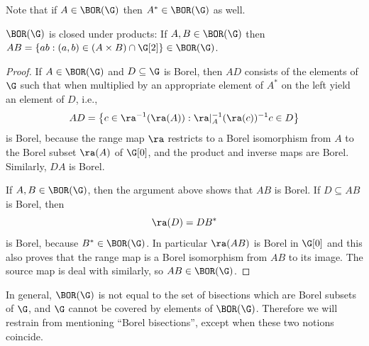 Note that if $A\in\BOR(\G)$ then $A^*\in \BOR(\G)$ as well.

\begin{proposition}
$\BOR(\G)$ is closed under products: If $A,B\in\BOR(\G)$ then $AB=\left\{ab:(a,b)\in(A\times B)\cap\G[2]\right\}\in\BOR(\G)$.
\end{proposition}
\begin{proof}
If $A\in\BOR(\G)$ and $D\subseteq\G$ is Borel, then $AD$ consists of the elements of $\G$ such that when multiplied by an appropriate element of $A^*$ on the left yield an element of $D$, i.e.,
\[AD=\left\{c\in\ra^{-1}(\ra(A)):\ra|_A^{-1}(\ra(c))^{-1}c\in D\right\}\]
is Borel, because the range map $\ra$ restricts to a Borel isomorphism from $A$ to the Borel subset $\ra(A)$ of $\G[0]$, and the product and inverse maps are Borel. Similarly, $DA$ is Borel.

If $A,B\in\BOR(\G)$, then the argument above shows that $AB$ is Borel. If $D\subseteq AB$ is Borel, then
\[\ra(D)=DB^*\]
is Borel, because $B^*\in\BOR(\G)$. In particular $\ra(AB)$ is Borel in $\G[0]$ and this also proves that the range map is a Borel isomorphism from $AB$ to its image. The source map is deal with similarly, so $AB\in\BOR(\G)$.\qedhere
\end{proof}

In general, $\BOR(\G)$ is not equal to the set of bisections which are Borel subsets of $\G$, and $\G$ cannot be covered by elements of $\BOR(\G)$. Therefore we will restrain from mentioning ``Borel bisections'', except when these two notions coincide.

